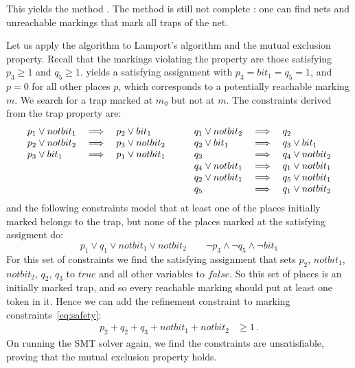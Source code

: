 This yields the method \safetyref.  The method is still not
complete \cite{EsparzaM00}: one can find nets and unreachable markings that 
mark all traps of the net.

Let us apply the algorithm \safetyref{} to Lamport's algorithm and the
mutual exclusion property. 
Recall that the markings violating the property are those satisfying $ p_3 \geq 1$ and  $q_5 \geq 1$. \safety{} yields a
satisfying assignment with $p_3 = bit_1 = q_5 = 1$,
and $p=0$ for all other places $p$, 
which corresponds to a potentially reachable marking $m$. 
We search for a trap marked at $m_0$ but not at $m$. The constraints 
derived from the trap property are:
$$\begin{array}{l}
\begin{array}[t]{lcl}
  p_1 \lor notbit_1 &\implies& p_2 \lor    bit_1 \\
  p_2 \lor notbit_2 &\implies& p_3 \lor notbit_2 \\
  p_3 \lor    bit_1 &\implies& p_1 \lor notbit_1
\end{array} \qquad
\begin{array}[t]{lcl}
  q_1 \lor notbit_2 &\implies& q_2               \\
  q_2 \lor    bit_1 &\implies& q_3 \lor    bit_1 \\
  q_3               &\implies& q_4 \lor notbit_2 \\
  q_4 \lor notbit_1 &\implies& q_1 \lor notbit_1 \\
  q_2 \lor notbit_1 &\implies& q_5 \lor notbit_1 \\
  q_5               &\implies& q_1 \lor notbit_2
\end{array}
\end{array}
$$
and the following constraints model that at least one of the places 
initially marked belongs to the trap, but none of the places marked at 
the satisfying assigment do:
$$p_1 \lor q_1 \lor notbit_1 \lor notbit_2  \qquad \neg p_3 \land \neg q_5 \land
\neg bit_1$$ For this set of constraints we find the satisfying assignment 
that sets $p_2$, $notbit_1$, $notbit_2$, $q_2$, $q_3$ to $\mathit{true}$ and all
other variables to $\mathit{false}$. 
So this set of places is an initially marked trap, and 
so every reachable marking should put at least one token in it. 
Hence we can add the refinement constraint to marking
constraints~\eqref{eq:safety}:
\begin{align*}
  p_2 + q_2 + q_3 + notbit_1 + notbit_2 & \ge 1\,.
\end{align*}
%
On running the SMT solver again, we find the constraints are unsatisfiable, 
proving that the mutual exclusion property holds.


